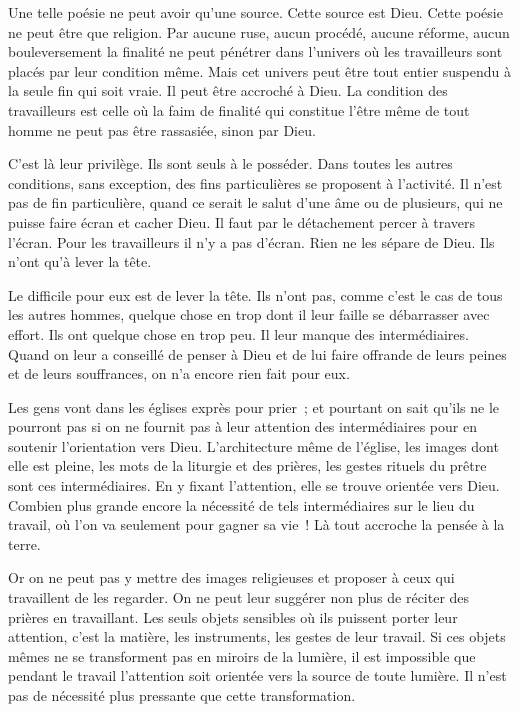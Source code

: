 \documentclass[french,twoside]{book} %
\begin{document}
Une telle poésie ne peut avoir qu'une source. Cette source est Dieu. Cette poésie ne peut être que religion. Par aucune ruse, aucun procédé, aucune réforme, aucun bouleversement la finalité ne peut pénétrer dans l’univers où les travailleurs sont placés par leur condition même. Mais cet univers peut être tout entier suspendu à la seule fin qui soit vraie. Il peut être accroché à Dieu. La condition des travailleurs est celle où la faim de finalité qui constitue l'être même de tout homme ne peut pas être rassasiée, sinon par Dieu.\par
C'est là leur privilège. Ils sont seuls à le posséder. Dans toutes les autres conditions, sans exception, des fins particulières se proposent à l'activité. Il n'est pas de fin particulière, quand ce serait le salut d'une âme ou de plusieurs, qui ne puisse faire écran et cacher Dieu. Il faut par le détachement percer à travers l'écran. Pour les travailleurs il n'y a pas d'écran. Rien ne les sépare de Dieu. Ils n'ont qu'à lever la tête.\par
Le difficile pour eux est de lever la tête. Ils n'ont pas, comme c'est le cas de tous les autres hommes, quelque chose en trop dont il leur faille se débarrasser avec effort. Ils ont quelque chose en trop peu. Il leur manque des intermédiaires. Quand on leur a conseillé de penser à Dieu et de lui faire offrande de leurs peines et de leurs souffrances, on n'a encore rien fait pour eux.\par
Les gens vont dans les églises exprès pour prier ; et pourtant on sait qu'ils ne le pourront pas si on ne fournit pas à leur attention des intermédiaires pour en soutenir l'orientation vers Dieu. L'architecture même de l'église, les images dont elle est pleine, les mots de la liturgie et des prières, les gestes rituels du prêtre sont ces intermédiaires. En y fixant l'attention, elle se trouve orientée vers Dieu. Combien plus grande encore la nécessité de tels intermédiaires sur le lieu du travail, où l'on va seulement pour gagner sa vie ! Là tout accroche la pensée à la terre.\par
Or on ne peut pas y mettre des images religieuses et proposer à ceux qui travaillent de les regarder. On ne peut leur suggérer non plus de réciter des prières en travaillant. Les seuls objets sensibles où ils puissent porter leur attention, c'est la matière, les instruments, les gestes de leur travail. Si ces objets mêmes ne se transforment pas en miroirs de la lumière, il est impossible que pendant le travail l'attention soit orientée vers la source de toute lumière. Il n'est pas de nécessité plus pressante que cette transformation.\par
\end{document}
